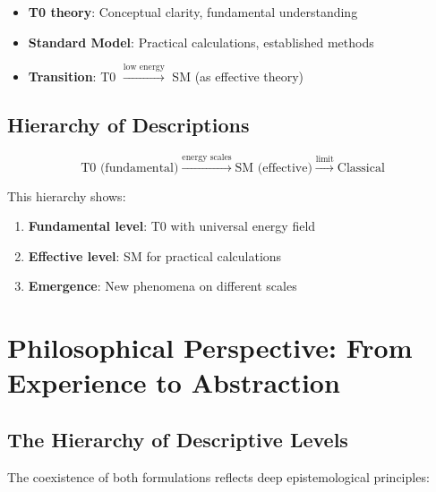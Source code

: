	\begin{tcolorbox}[colback=yellow!5!white,colframe=yellow!75!black,title=Fundamental Complementarity]
		\begin{itemize}
			\item \textbf{T0 theory}: Conceptual clarity, fundamental understanding
			\item \textbf{Standard Model}: Practical calculations, established methods
			\item \textbf{Transition}: T0 $\xrightarrow{\text{low energy}}$ SM (as effective theory)
		\end{itemize}
	\end{tcolorbox}
	
	\subsection{Hierarchy of Descriptions}
	
	\begin{equation}
		\text{T0 (fundamental)} \xrightarrow{\text{energy scales}} \text{SM (effective)} \xrightarrow{\text{limit}} \text{Classical}
	\end{equation}
	
	This hierarchy shows:
	\begin{enumerate}
		\item \textbf{Fundamental level}: T0 with universal energy field
		\item \textbf{Effective level}: SM for practical calculations
		\item \textbf{Emergence}: New phenomena on different scales
	\end{enumerate}
	
	\section{Philosophical Perspective: From Experience to Abstraction}
	
	\subsection{The Hierarchy of Descriptive Levels}
	
	The coexistence of both formulations reflects deep epistemological principles:
	
